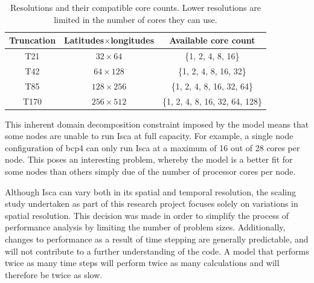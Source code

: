 \documentclass[a4paper,11pt]{report}
\begin{document}
\begin{table}[htbp]
\caption[Resolutions and their compatible core counts]{Resolutions and their compatible core counts. Lower resolutions are limited in the number of cores they can use.}
\begin{center}
\begin{tabular}{ c c c }
\toprule
\textbf{Truncation} 	& \textbf{Latitudes}$\times$\textbf{longitudes} 		& \textbf{Available core count} \\\midrule
 T21 				& $32\times64$								& \{1, 2, 4, 8, 16\} \\  
 T42 				& $64\times128$							& \{1, 2, 4, 8, 16, 32\} \\
 T85 				& $128\times256$ 							& \{1, 2, 4, 8, 16, 32, 64\} \\
 T170 			& $256\times512$ 							& \{1, 2, 4, 8, 16, 32, 64, 128\}    \\\bottomrule
\end{tabular}
\label{tbl:resolutions}
\end{center}
\end{table}
\par
This inherent domain decomposition constraint imposed by the model means that some nodes are unable to run Isca at full capacity. For example, a single node configuration of \gls{bcp4} can only run Isca at a maximum of 16 out of 28 cores per node. This poses an interesting problem, whereby the model is a better fit for some nodes than others simply due of the number of processor cores per node. 
\par
Although Isca can vary both in its spatial and temporal resolution, the scaling study undertaken as part of this research project focuses solely on variations in spatial resolution. This decision was made in order to simplify the process of performance analysis by limiting the number of problem sizes. Additionally, changes to performance as a result of time stepping are generally predictable, and will not contribute to a further understanding of the code. A model that performs twice as many time steps will perform twice as many calculations and will therefore be twice as slow. 
\end{document}

